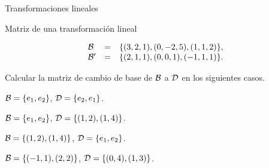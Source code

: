 \begin{chapter}{Transformaciones lineales}
\begin{section}{Matriz de una transformaci\'on lineal}
\begin{enumex}
\begin{enumex}
\begin{minipage}{0.5\textwidth}
                    \begin{equation*}
                        \begin{array}{lll}
                            \mathcal{B} &=&\{(3, 2,1), (0, -2,5), (1,1, 2)\}, \\
                            \mathcal{B}' &=&\{(2, 1, 1), (0, 0, 1), ( -1, 1, 1)\}.
                        \end{array}
                    \end{equation*}
                \end{minipage}
            \end{enumex}
            \item Calcular la matriz de cambio de base de $\mathcal{B}$ a $\mathcal{D}$ en los siguientes casos. 
            \begin{enumex}
                \begin{minipage}{0.4\textwidth}
                    \item $\mathcal{B} = \{ e_1,e_2\}$, $\mathcal{D} = \{e_2,e_1\}$.
                \end{minipage}
                \begin{minipage}{0.4\textwidth}
                    \item $\mathcal{B} = \{e_1,e_2 \}$, $\mathcal{D} = \{(1,2),(1,4) \}$.
                \end{minipage}
            
                    \item $\mathcal{B} = \{(1,2),(1,4) \}$, $\mathcal{D} =\{e_1,e_2 \}$.

                    \item $\mathcal{B} = \{(-1,1),(2,2)  \}$, $\mathcal{D} = \{(0,4),(1,3)  \}$.
 

\end{enumex}
\end{enumex}
\end{section}
\end{chapter}
